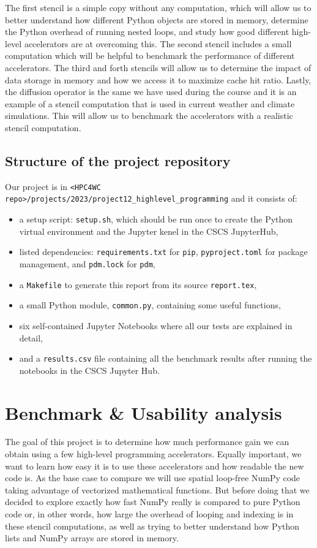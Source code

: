 \documentclass[12pt]{article}
\begin{document}
The first stencil is a simple copy without any computation, which will allow us to better understand how different Python objects are stored in memory, determine the Python overhead of running nested loops, and study how good different high-level accelerators are at overcoming this. The second stencil includes a small computation which will be helpful to benchmark the performance of different accelerators. The third and forth stencils will allow us to determine the impact of data storage in memory and how we access it to maximize cache hit ratio. Lastly, the diffusion operator is the same we have used during the course and it is an example of a stencil computation that is used in current weather and climate simulations. This will allow us to benchmark the accelerators with a realistic stencil computation.

\subsection{Structure of the project repository}

Our project is in \texttt{<HPC4WC repo>/projects/2023/project12\_highlevel\_programming} and it consists of:
\begin{itemize}
    \item a setup script: \texttt{setup.sh}, which should be run once to create the Python virtual environment and the Jupyter kenel in the CSCS JupyterHub,
    \item listed dependencies: \texttt{requirements.txt} for \texttt{pip}, \texttt{pyproject.toml} for package management, and \texttt{pdm.lock} for \texttt{pdm},
    \item a \texttt{Makefile} to generate this report from its source \texttt{report.tex},
    \item a small Python module, \texttt{common.py}, containing some useful functions,
    \item six self-contained Jupyter Notebooks where all our tests are explained in detail,
    \item and a \texttt{results.csv} file containing all the benchmark results after running the notebooks in the CSCS Jupyter Hub.
\end{itemize}

\section{Benchmark \& Usability analysis}

The goal of this project is to determine how much performance gain we can obtain using a few high-level programming accelerators. Equally important, we want to learn how easy it is to use these accelerators and how readable the new code is. As the base case to compare we will use spatial loop-free NumPy code taking advantage of vectorized mathematical functions. But before doing that we decided to explore exactly how fast NumPy really is compared to pure Python code or, in other words, how large the overhead of looping and indexing is in these stencil computations, as well as trying to better understand how Python lists and NumPy arrays are stored in memory.
\end{document}
